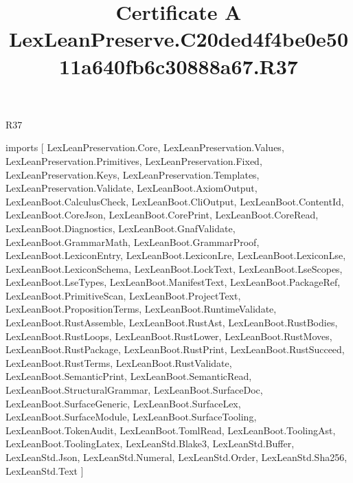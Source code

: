 \begin{lexlean}{R37}
\title{Certificate A LexLeanPreserve.C20ded4f4be0e5011a640fb6c30888a67.R37}
\begin{coremodule}
imports [
  LexLeanPreservation.Core,
  LexLeanPreservation.Values,
  LexLeanPreservation.Primitives,
  LexLeanPreservation.Fixed,
  LexLeanPreservation.Keys,
  LexLeanPreservation.Templates,
  LexLeanPreservation.Validate,
  LexLeanBoot.AxiomOutput,
  LexLeanBoot.CalculusCheck,
  LexLeanBoot.CliOutput,
  LexLeanBoot.ContentId,
  LexLeanBoot.CoreJson,
  LexLeanBoot.CorePrint,
  LexLeanBoot.CoreRead,
  LexLeanBoot.Diagnostics,
  LexLeanBoot.GnafValidate,
  LexLeanBoot.GrammarMath,
  LexLeanBoot.GrammarProof,
  LexLeanBoot.LexiconEntry,
  LexLeanBoot.LexiconLre,
  LexLeanBoot.LexiconLse,
  LexLeanBoot.LexiconSchema,
  LexLeanBoot.LockText,
  LexLeanBoot.LseScopes,
  LexLeanBoot.LseTypes,
  LexLeanBoot.ManifestText,
  LexLeanBoot.PackageRef,
  LexLeanBoot.PrimitiveScan,
  LexLeanBoot.ProjectText,
  LexLeanBoot.PropositionTerms,
  LexLeanBoot.RuntimeValidate,
  LexLeanBoot.RustAssemble,
  LexLeanBoot.RustAst,
  LexLeanBoot.RustBodies,
  LexLeanBoot.RustLoops,
  LexLeanBoot.RustLower,
  LexLeanBoot.RustMoves,
  LexLeanBoot.RustPackage,
  LexLeanBoot.RustPrint,
  LexLeanBoot.RustSucceed,
  LexLeanBoot.RustTerms,
  LexLeanBoot.RustValidate,
  LexLeanBoot.SemanticPrint,
  LexLeanBoot.SemanticRead,
  LexLeanBoot.StructuralGrammar,
  LexLeanBoot.SurfaceDoc,
  LexLeanBoot.SurfaceGeneric,
  LexLeanBoot.SurfaceLex,
  LexLeanBoot.SurfaceModule,
  LexLeanBoot.SurfaceTooling,
  LexLeanBoot.TokenAudit,
  LexLeanBoot.TomlRead,
  LexLeanBoot.ToolingAst,
  LexLeanBoot.ToolingLatex,
  LexLeanStd.Blake3,
  LexLeanStd.Buffer,
  LexLeanStd.Json,
  LexLeanStd.Numeral,
  LexLeanStd.Order,
  LexLeanStd.Sha256,
  LexLeanStd.Text
]


\end{coremodule}
\end{lexlean}
